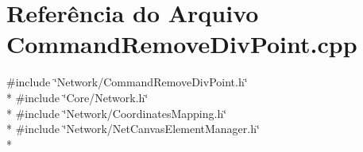 \section{Referência do Arquivo Command\+Remove\+Div\+Point.\+cpp}
\label{_command_remove_div_point_8cpp}
{\ttfamily \#include \char`\"{}Network/\+Command\+Remove\+Div\+Point.\+h\char`\"{}}\\*
{\ttfamily \#include \char`\"{}Core/\+Network.\+h\char`\"{}}\\*
{\ttfamily \#include \char`\"{}Network/\+Coordinates\+Mapping.\+h\char`\"{}}\\*
{\ttfamily \#include \char`\"{}Network/\+Net\+Canvas\+Element\+Manager.\+h\char`\"{}}\\*
